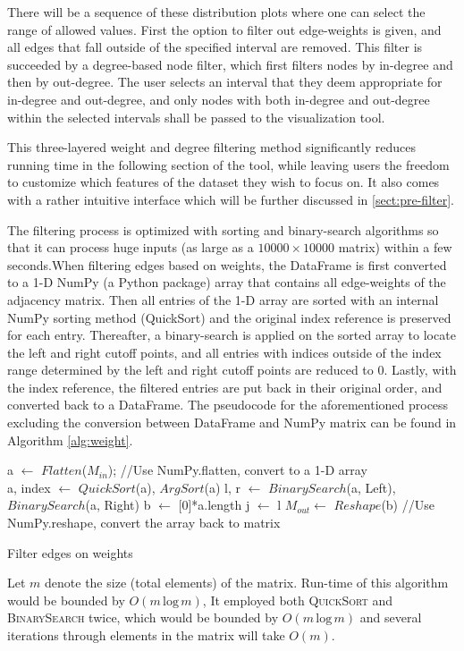 \documentclass[journal]{vgtc}                %
\begin{document}
There will be a sequence of these distribution plots where one can select the range of allowed values. First the option to filter out edge-weights is given, and all edges that fall outside of the specified interval are removed. This filter is succeeded by a degree-based node filter, which first filters nodes by in-degree and then by out-degree. The user selects an interval that they deem appropriate for in-degree and out-degree, and only nodes with both in-degree and out-degree within the selected intervals shall be passed to the visualization tool.  

This three-layered weight and degree filtering method significantly reduces running time in the following section of the tool, while leaving users the freedom to customize which features of the dataset they wish to focus on. It also comes with a rather intuitive interface which will be further discussed in \ref{sect:pre-filter}.

The filtering process is optimized with sorting and binary-search algorithms so that it can process huge inputs (as large as a $10000\times 10000$ matrix) within a few seconds.When filtering edges based on weights, the DataFrame is first converted to a 1-D NumPy (a Python package) array that contains all edge-weights of the adjacency matrix. Then all entries of the 1-D array are sorted with an internal NumPy sorting method (QuickSort) and the original index reference is preserved for each entry. Thereafter, a binary-search is applied on the sorted array to locate the left and right cutoff points, and all entries with indices outside of the index range determined by the left and right cutoff points are reduced to 0. Lastly, with the index reference, the filtered entries are put back in their original order, and converted back to a DataFrame. The pseudocode for the aforementioned process excluding the conversion between DataFrame and NumPy matrix can be found in Algorithm \ref{alg:weight}. 

\begin{algorithm}[hbt]
  a $\leftarrow$ $Flatten$($M_{in}$); //Use NumPy.flatten, convert to a 1-D array\\
  a, index $\leftarrow$ $QuickSort$(a), $ArgSort$(a)\;
  l, r $\leftarrow$ $BinarySearch$(a, Left), $BinarySearch$(a, Right)\;
  b $\leftarrow$ [0]*a.length\; 
  j $\leftarrow$ l\;
 $M_{out} \leftarrow$ $Reshape$(b) \; 
 //Use NumPy.reshape, convert the array back to matrix \\
 \caption{Filter edges on weights}
 \label{alg:weight}
\end{algorithm}
Let $m$ denote the size (total elements) of the matrix. Run-time of this algorithm would be bounded by $O(m \, \text{log} \, m)$,  It employed both \textsc{QuickSort} and \textsc{BinarySearch} twice, which would be bounded by $O(m \, \text{log} \, m)$ and several iterations through elements in the matrix will take $O(m)$. 
\end{document}
